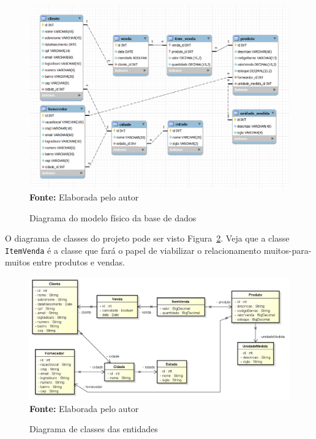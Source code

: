 \FloatBarrier
\begin{figure}[!htbp]
    \centering
    \caption{Diagrama do modelo físico da base de dados}
    \includegraphics[scale=0.55]{imagens/cap08ModeloFisico}
    \\\textbf{Fonte:} Elaborada pelo autor
    \label{fig:cap08ModeloFisico}
\end{figure}
\FloatBarrier

O diagrama de classes do projeto pode ser visto Figura~\ref{fig:cap08DiagramaClasses}. Veja que a classe \texttt{ItemVenda} é a classe que fará o papel de viabilizar o relacionamento muitos-para-muitos entre produtos e vendas.

\FloatBarrier
\begin{figure}[!htbp]
    \centering
    \caption{Diagrama de classes das entidades}
    \includegraphics[scale=0.5]{imagens/cap08DiagramaClasses}
    \\\textbf{Fonte:} Elaborada pelo autor
    \label{fig:cap08DiagramaClasses}
\end{figure}
\FloatBarrier

